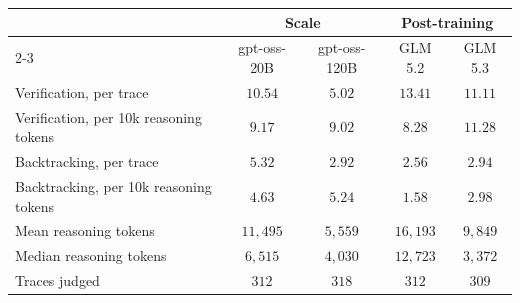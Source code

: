 \begin{tabular}{lcccc}
\toprule
 & \multicolumn{2}{c}{Scale} & \multicolumn{2}{c}{Post-training} \\
\cmidrule{2-3}\cmidrule{4-5}
 & gpt-oss-20B & gpt-oss-120B & GLM 5.2 & GLM 5.3 \\
\midrule
Verification, per trace & $10.54$ & $5.02$ & $13.41$ & $11.11$ \\
Verification, per 10k reasoning tokens & $9.17$ & $9.02$ & $8.28$ & $11.28$ \\
Backtracking, per trace & $5.32$ & $2.92$ & $2.56$ & $2.94$ \\
Backtracking, per 10k reasoning tokens & $4.63$ & $5.24$ & $1.58$ & $2.98$ \\
\addlinespace
Mean reasoning tokens & $11{,}495$ & $5{,}559$ & $16{,}193$ & $9{,}849$ \\
Median reasoning tokens & $6{,}515$ & $4{,}030$ & $12{,}723$ & $3{,}372$ \\
Traces judged & $312$ & $318$ & $312$ & $309$ \\
\bottomrule
\end{tabular}
